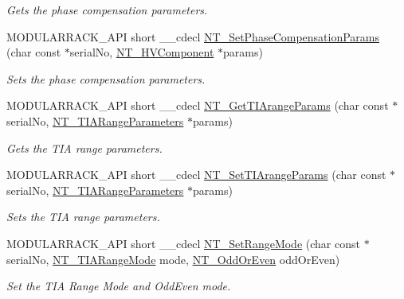 \begin{DoxyCompactItemize}
\begin{DoxyCompactList}\small\item\em Gets the phase compensation parameters. \end{DoxyCompactList}\item 
M\+O\+D\+U\+L\+A\+R\+R\+A\+C\+K\+\_\+\+A\+PI short \+\_\+\+\_\+cdecl \hyperlink{group___modular_nano_trak_ga1cdd0cf98ccadaf4c1a2d18ff2d3e798}{N\+T\+\_\+\+Set\+Phase\+Compensation\+Params} (char const $\ast$serial\+No, \hyperlink{struct_n_t___h_v_component}{N\+T\+\_\+\+H\+V\+Component} $\ast$params)
\begin{DoxyCompactList}\small\item\em Sets the phase compensation parameters. \end{DoxyCompactList}\item 
M\+O\+D\+U\+L\+A\+R\+R\+A\+C\+K\+\_\+\+A\+PI short \+\_\+\+\_\+cdecl \hyperlink{group___modular_nano_trak_gadc90cefc05edac1265eea27511dd7b04}{N\+T\+\_\+\+Get\+T\+I\+Arange\+Params} (char const $\ast$serial\+No, \hyperlink{struct_n_t___t_i_a_range_parameters}{N\+T\+\_\+\+T\+I\+A\+Range\+Parameters} $\ast$params)
\begin{DoxyCompactList}\small\item\em Gets the T\+IA range parameters. \end{DoxyCompactList}\item 
M\+O\+D\+U\+L\+A\+R\+R\+A\+C\+K\+\_\+\+A\+PI short \+\_\+\+\_\+cdecl \hyperlink{group___modular_nano_trak_ga78d9e3dd63241b17710ee4a7b280331e}{N\+T\+\_\+\+Set\+T\+I\+Arange\+Params} (char const $\ast$serial\+No, \hyperlink{struct_n_t___t_i_a_range_parameters}{N\+T\+\_\+\+T\+I\+A\+Range\+Parameters} $\ast$params)
\begin{DoxyCompactList}\small\item\em Sets the T\+IA range parameters. \end{DoxyCompactList}\item 
M\+O\+D\+U\+L\+A\+R\+R\+A\+C\+K\+\_\+\+A\+PI short \+\_\+\+\_\+cdecl \hyperlink{group___modular_nano_trak_gaf5d9bb37c45709748a65697cc21e8634}{N\+T\+\_\+\+Set\+Range\+Mode} (char const $\ast$serial\+No, \hyperlink{group___common_ga17a2e7154218bc950c0568a08a1307a8}{N\+T\+\_\+\+T\+I\+A\+Range\+Mode} mode, \hyperlink{group___common_gafd24ee04cee037f4d90814dde903e2b2}{N\+T\+\_\+\+Odd\+Or\+Even} odd\+Or\+Even)
\begin{DoxyCompactList}\small\item\em Set the T\+IA Range Mode and Odd\+Even mode. \end{DoxyCompactList}\item 

\end{DoxyCompactItemize}
